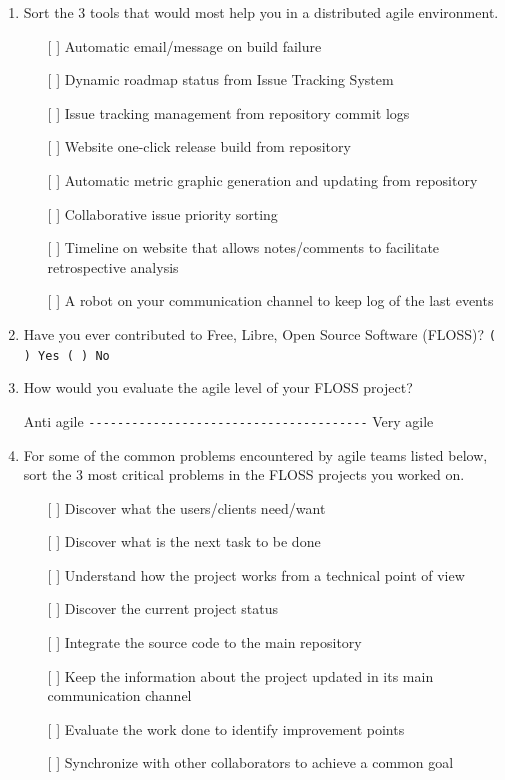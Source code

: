\documentclass[lnbip]{svmultln}
\begin{document}
\begin{enumerate}
\item Sort the 3 tools that would most help you in a distributed agile
  environment.
  \begin{itemize}
  \item[[ ] ] Automatic email/message on build failure
  \item[[ ] ] Dynamic roadmap status from Issue Tracking System
  \item[[ ] ] Issue tracking management from repository commit logs
  \item[[ ] ] Website one-click release build from repository
  \item[[ ] ] Automatic metric graphic generation and updating from
    repository
  \item[[ ] ] Collaborative issue priority sorting
  \item[[ ] ] Timeline on website that allows notes/comments to
    facilitate retrospective analysis
  \item[[ ] ] A robot on your communication channel to keep log of the
    last events
  \end{itemize}
\vspace{8pt}

\item Have you ever contributed to Free, Libre, Open Source Software
  (FLOSS)?  \verb=( ) Yes ( ) No= \vspace{8pt}

\item How would you evaluate the agile level of your FLOSS project?

  Anti agile \verb=---------------------------------------= Very agile
  \vspace{8pt}

\item For some of the common problems encountered by agile teams
  listed below, sort the 3 most critical problems in the FLOSS
  projects you worked on.
  \begin{itemize}
  \item[[ ] ] Discover what the users/clients need/want
  \item[[ ] ] Discover what is the next task to be done
  \item[[ ] ] Understand how the project works from a technical point
    of view
  \item[[ ] ] Discover the current project status
  \item[[ ] ] Integrate the source code to the main repository
  \item[[ ] ] Keep the information about the project updated in its
    main communication channel
  \item[[ ] ] Evaluate the work done to identify improvement points
  \item[[ ] ] Synchronize with other collaborators to achieve a common
    goal
  \end{itemize}
  \vspace{8pt}


\end{enumerate}
\end{document}
